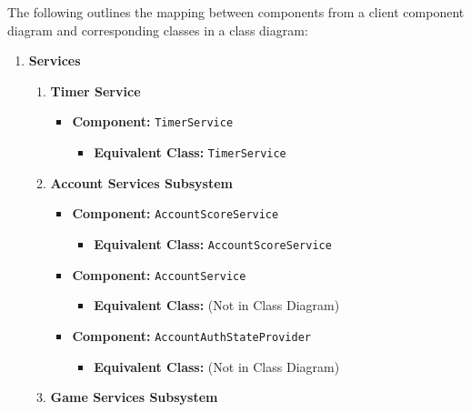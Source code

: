 \documentclass[11pt,a4paper]{article}
\begin{document}
The following outlines the mapping between components from a client component diagram and corresponding classes in a class diagram:
\begin{enumerate}[label=\textbf{\arabic*.}, ref=\arabic*]
    \item \textbf{Services}
        \begin{enumerate}[label=\textbf{\alph*.}, ref=\theenumi.\alph*]
            \item \textbf{Timer Service}
                \begin{itemize}
                    \item \textbf{Component:} \texttt{TimerService}
                        \begin{itemize}
                            \item \textbf{Equivalent Class:} \texttt{TimerService}
                        \end{itemize}
                \end{itemize}
            \item \textbf{Account Services Subsystem}
                \begin{itemize}
                    \item \textbf{Component:} \texttt{AccountScoreService}
                        \begin{itemize}
                            \item \textbf{Equivalent Class:} \texttt{AccountScoreService}
                        \end{itemize}
                    \item \textbf{Component:} \texttt{AccountService}
                        \begin{itemize}
                            \item \textbf{Equivalent Class:} (Not in Class Diagram)
                        \end{itemize}
                    \item \textbf{Component:} \texttt{AccountAuthStateProvider}
                        \begin{itemize}
                            \item \textbf{Equivalent Class:} (Not in Class Diagram)
                        \end{itemize}
                \end{itemize}
            \item \textbf{Game Services Subsystem}
                \begin{itemize}

\end{itemize}
\end{enumerate}
\end{enumerate}
\end{document}
